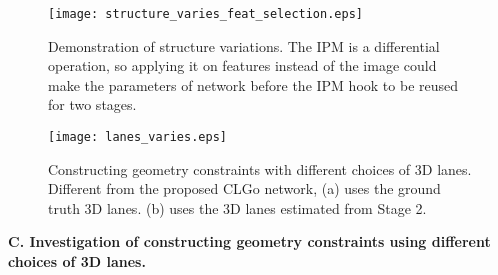 \documentclass[letterpaper]{article} \usepackage{aaai22}  \usepackage{times}  \usepackage{helvet}  \usepackage{courier}  \usepackage[hyphens]{url}  \usepackage{graphicx} \urlstyle{rm} \def\UrlFont{\rm}  \usepackage{natbib}  \usepackage{caption}
\begin{document}
\begin{figure*}[t]
\begin{center}
\texttt{[image: structure\_varies\_feat\_selection.eps]}
\end{center}
\caption{Demonstration of structure variations. The IPM is a differential operation, so applying it on features instead of the image could make the parameters of network before the IPM hook to be reused for two stages.}
\label{fig:investigation-structure}
\end{figure*}


\begin{figure}[h]
\begin{center}
\texttt{[image: lanes\_varies.eps]}
\end{center}
\caption{Constructing geometry constraints with different choices of 3D lanes. Different from the proposed CLGo network, (a) uses the ground truth 3D lanes. (b) uses the 3D lanes estimated from Stage 2.}
\label{fig:investigation-lanes}
\end{figure}

\begin{table}[h]
\begin{center}
\caption{Quantitative results of different 3D lanes for constructing geometry constraints.}
\label{tab:lane-study}
\end{center}
\vspace{-1.5em}
\end{table}

\noindent \textbf{C. Investigation of constructing geometry constraints using different choices of 3D lanes.}
\end{document}
